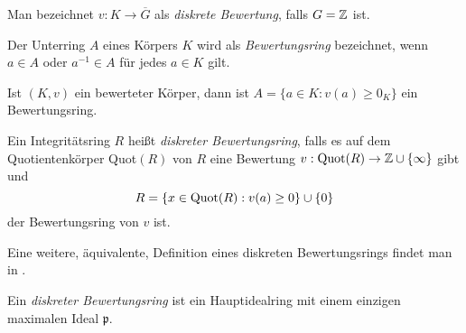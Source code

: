 Man bezeichnet $v\colon K \to \overline{G} $ als \textit{diskrete Bewertung}, falls ${G} = \mathbb{Z}$ ist.
%
\begin{defn} %
Der Unterring $A$ eines Körpers $K$ wird als \textit{Bewertungsring} bezeichnet, wenn $a \in A$ oder $a^{-1}\in A$ für jedes $a\in K$ gilt.
\end{defn}
\begin{bem}
Ist $\left(K, v\right)$ ein bewerteter Körper, dann ist $A = \lbrace a \in K\colon v(a) \geq 0_K\rbrace$ ein Bewertungsring.
\end{bem}
\begin{defn}   %
Ein Integritätsring $R$ heißt \textit{diskreter Bewertungsring}, falls es auf dem Quotientenkörper \textup{Quot}$(R)$ von $R$ eine Bewertung $v: \textup{Quot}(R) \rightarrow \mathbb{Z} \cup \lbrace\infty\rbrace$ gibt und 
\[R = \lbrace x \in \textup{Quot}(R): v(a) \ge 0 \rbrace \cup \lbrace 0 \rbrace\]
der Bewertungsring von $v$ ist.
\end{defn}
Eine weitere, äquivalente, Definition eines diskreten Bewertungsrings findet man in \cite[S. 126]{neukirch92}.
\begin{defn} \label{bewertungsring}%
Ein \textit{diskreter Bewertungsring} ist ein Hauptidealring mit einem einzigen maximalen Ideal $\mathfrak{p}$.
\end{defn} 
